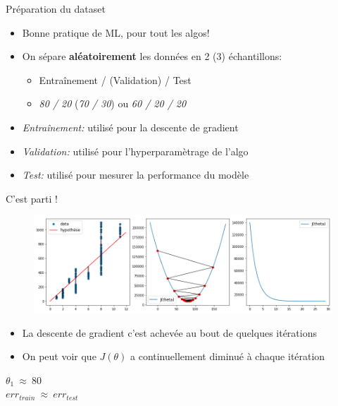 \documentclass[11pt]{beamer}
\begin{document}
\begin{frame}{Préparation du dataset}
  \begin{itemize}
  \item Bonne pratique de ML, pour tout les algos!
  \item On sépare \textbf{aléatoirement} les données en 2 (3) échantillons:
    \begin{itemize}
      \normalsize
    \item Entraînement / (Validation) / Test
    \item \textit{80 / 20} (\textit{70 / 30}) ou \textit{60 / 20 / 20}
    \end{itemize}
    \vspace{0.2cm}
  \item \textit{Entraînement:} utilisé pour la descente de gradient
  \item \textit{Validation:} utilisé pour l'hyperparamètrage de l'algo
  \item \textit{Test:} utilisé pour mesurer la performance du modèle
  \end{itemize}
\end{frame}

\begin{frame}{C'est parti !}
  \begin{figure}
    \includegraphics[width=\textwidth]{figs/gradDescent.png}
  \end{figure}
  \begin{itemize}
  \item La descente de gradient c'est achevée au bout de quelques itérations
  \item On peut voir que $J(\theta)$ a continuellement diminué à chaque itération
  \end{itemize}
  \begin{center}
    $\theta_{1} ~ \approx ~ 80$ \\
    $err_{train} ~ \approx ~ err_{test}$
  \end{center}
\end{frame}
\end{document}
